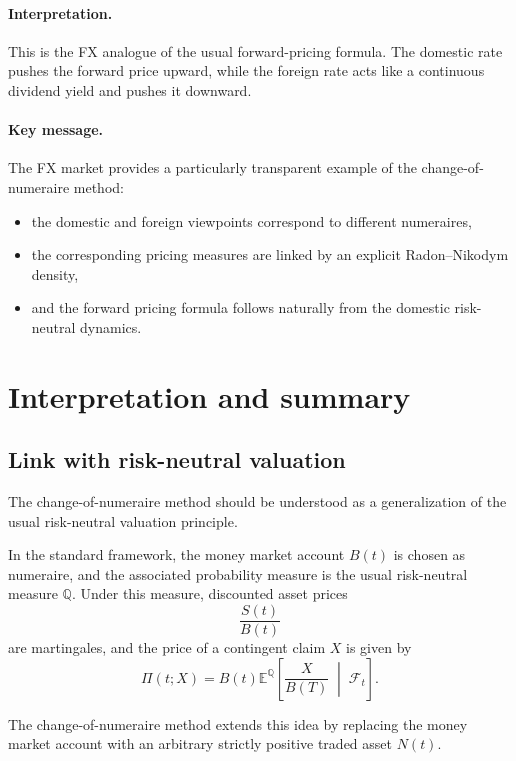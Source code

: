 \documentclass[11pt]{article}
\newcommand{\Qbb}{\mathbb{Q}}
\newcommand{\E}{\mathbb{E}}
\theoremstyle{definition}
\theoremstyle{plain}
\begin{document}
\paragraph{Interpretation.}

This is the FX analogue of the usual forward-pricing formula.
The domestic rate pushes the forward price upward, while the foreign
rate acts like a continuous dividend yield and pushes it downward.

\paragraph{Key message.}

The FX market provides a particularly transparent example of the
change-of-numeraire method:
\begin{itemize}[leftmargin=1.4em]
\item the domestic and foreign viewpoints correspond to different
numeraires,
\item the corresponding pricing measures are linked by an explicit
Radon--Nikodym density,
\item and the forward pricing formula follows naturally from the
domestic risk-neutral dynamics.
\end{itemize}


\section{Interpretation and summary}

\subsection{Link with risk-neutral valuation}

The change-of-numeraire method should be understood as a generalization
of the usual risk-neutral valuation principle.

In the standard framework, the money market account \(B(t)\) is chosen
as numeraire, and the associated probability measure is the usual
risk-neutral measure \(\Qbb\).
Under this measure, discounted asset prices
\[
\frac{S(t)}{B(t)}
\]
are martingales, and the price of a contingent claim \(X\) is given by
\[
\Pi(t;X)
=
B(t)\E^\Qbb\!\left[
\frac{X}{B(T)}
\;\middle|\;
\mathcal{F}_t
\right].
\]

The change-of-numeraire method extends this idea by replacing the money
market account with an arbitrary strictly positive traded asset \(N(t)\).
\end{document}
